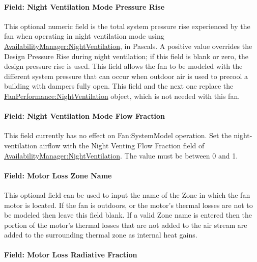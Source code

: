 \paragraph{Field: Night Ventilation Mode Pressure Rise}\label{field-nite-vent-pressure-fansysmodel}

This optional numeric field is the total system pressure rise experienced by the fan when operating in night ventilation mode using \hyperref[availabilitymanagernightventilation]{AvailabilityManager:NightVentilation}, in Pascals. A positive value overrides the Design Pressure Rise during night ventilation; if this field is blank or zero, the design pressure rise is used. This field allows the fan to be modeled with the different system pressure that can occur when outdoor air is used to precool a building with dampers fully open. This field and the next one replace the \hyperref[fanperformancenightventilation]{FanPerformance:NightVentilation} object, which is not needed with this fan.

\paragraph{Field: Night Ventilation Mode Flow Fraction}\label{field-nite-vent-flow-fraction-fansysmodel}

This field currently has no effect on Fan:SystemModel operation. Set the night-ventilation airflow with the Night Venting Flow Fraction field of \hyperref[availabilitymanagernightventilation]{AvailabilityManager:NightVentilation}. The value must be between 0 and 1.

\paragraph{Field: Motor Loss Zone Name}\label{field-loss-zone-name-fansysmodel}

This optional field can be used to input the name of the Zone in which the fan motor is located.  If the fan is outdoors, or the motor's thermal losses are not to be modeled then leave this field blank.  If a valid Zone name is entered then the portion of the motor's thermal losses that are not added to the air stream are added to the surrounding thermal zone as internal heat gains.

\paragraph{Field: Motor Loss Radiative Fraction}\label{field-loss-rad-frac-fansysmodel}

